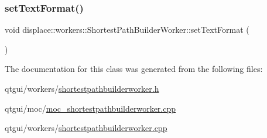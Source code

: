 \subsubsection{\texorpdfstring{setTextFormat()}{setTextFormat()}}
{\footnotesize\ttfamily void displace\+::workers\+::\+Shortest\+Path\+Builder\+Worker\+::set\+Text\+Format (\begin{DoxyParamCaption}{ }\end{DoxyParamCaption})\hspace{0.3cm}{\ttfamily [inline]}}



The documentation for this class was generated from the following files\+:\begin{DoxyCompactItemize}
\item 
qtgui/workers/\mbox{\hyperlink{shortestpathbuilderworker_8h}{shortestpathbuilderworker.\+h}}\item 
qtgui/moc/\mbox{\hyperlink{moc__shortestpathbuilderworker_8cpp}{moc\+\_\+shortestpathbuilderworker.\+cpp}}\item 
qtgui/workers/\mbox{\hyperlink{shortestpathbuilderworker_8cpp}{shortestpathbuilderworker.\+cpp}}\end{DoxyCompactItemize}
